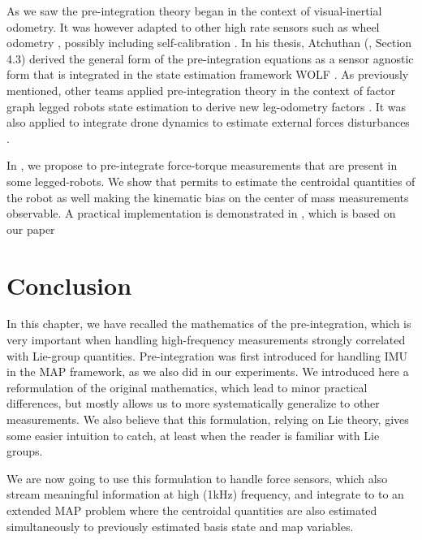 As we saw the pre-integration theory began in the context of visual-inertial odometry. It was however adapted to other high rate sensors such as wheel odometry \cite{quan2019tightly}, 
possibly including self-calibration \cite{deray-19-selfcalib}. In his thesis, Atchuthan (\cite{atchuthan-18-thesis}, Section 4.3) derived the general form of the pre-integration 
equations as a sensor agnostic form that is integrated in the state estimation framework WOLF \cite{sola2021wolf}. As previously mentioned, other teams applied pre-integration theory in the 
context of factor graph legged robots state estimation to derive new leg-odometry factors \cite{hartley2018legged, wisth2019robust, wisth2020preintegrated}.
It was also applied to integrate drone dynamics to estimate external forces disturbances \cite{nisar2019vimo}.

In , we propose to pre-integrate force-torque measurements that are present in some legged-robots. 
We show that permits to estimate the centroidal quantities of the robot as well making the kinematic bias on the center of mass measurements observable. 
A practical implementation is demonstrated in , which is based on our paper \cite{fourmy2021contact}



\section{Conclusion}

In this chapter, we have recalled the mathematics of the pre-integration,
which is very important when handling high-frequency measurements strongly
correlated with Lie-group quantities. Pre-integration was first introduced for
handling IMU in the MAP framework, as we also did in our experiments. We
introduced here a reformulation of the original mathematics, which lead to
minor practical differences, but mostly allows us to more systematically generalize
to other measurements. We also believe that this formulation, relying on
Lie theory, gives some easier intuition to catch, at least when the reader is
familiar with Lie groups.

We are now going to use this formulation to handle force sensors, which also
stream meaningful information at high (1kHz) frequency, and integrate to
to an extended MAP problem where the centroidal quantities are also estimated
simultaneously to previously estimated basis state and map variables.

